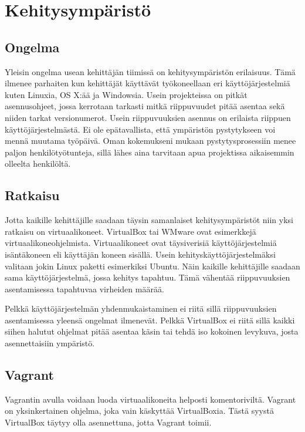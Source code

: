 \chapter{Kehitysympäristö}

\section{Ongelma}
Yleisin ongelma usean kehittäjän tiimissä on kehitysympäristön erilaisuus. Tämä ilmenee parhaiten kun kehittäjät käyttävät työkoneellaan eri käyttöjärjestelmiä kuten Linuxia, OS X:ää ja Windowsia. Usein projekteissa on pitkät asennusohjeet, jossa kerrotaan tarkasti mitkä riippuvuudet pitää asentaa sekä niiden tarkat versionumerot. Usein riippuvuuksien asennus on erilaista riippuen käyttöjärjestelmästä. Ei ole epätavallista, että ympäristön pystytykseen voi mennä muutama työpäivä. Oman kokemukseni mukaan pystytysprosessiin menee paljon henkilötyötunteja, sillä lähes aina tarvitaan apua projektissa aikaisemmin olleelta henkilöltä.

\section{Ratkaisu}
Jotta kaikille kehittäjille saadaan täysin samanlaiset kehitysympäristöt niin yksi ratkaisu on virtuaalikoneet. VirtualBox tai WMware ovat esimerkkejä virtuaalikoneohjelmista. Virtuaalikoneet ovat täysiverisiä käyttöjärjestelmiä isäntäkoneen eli käyttäjän koneen sisällä. Usein kehityskäyttöjärjestelmäksi valitaan jokin Linux paketti esimerkiksi Ubuntu. Näin kaikille kehittäjille saadaan sama käyttöjärjestelmä, jossa kehitys tapahtuu. Tämä vähentää riippuvuuksien asentamisessa tapahtuvaa virheiden määrää.

Pelkkä käyttöjärjestelmän yhdenmukaistaminen ei riitä sillä riippuvuuksien asentamisessa yleensä ongelmat ilmenevät. Pelkkä VirtualBox ei riitä sillä kaikki siihen halutut ohjelmat pitää asentaa käsin tai tehdä iso kokoinen levykuva, josta asennettaisiin ympäristö.

\section{Vagrant}
Vagrantin avulla voidaan luoda virtuaalikoneita helposti komentoriviltä. Vagrant on yksinkertainen ohjelma, joka vain käskyttää VirtualBoxia. Tästä syystä VirtualBox täytyy olla asennettuna, jotta Vagrant toimii.

